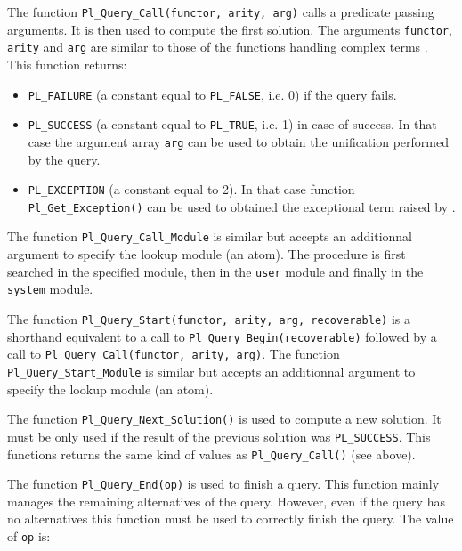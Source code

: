 The function \texttt{Pl\_Query\_Call(functor, arity, arg)} calls a predicate
passing arguments. It is then used to compute the first solution. The
arguments \texttt{functor}, \texttt{arity} and \texttt{arg} are similar to
those of the functions handling complex terms
. This function returns:

\begin{itemize}

\item \texttt{PL\_FAILURE} (a constant equal to \texttt{PL\_FALSE}, i.e. 0) if
the query fails.

\item \texttt{PL\_SUCCESS} (a constant equal to \texttt{PL\_TRUE}, i.e. 1) in
case of success. In that case the argument array \texttt{arg} can be used to
obtain the unification performed by the query.

\item \texttt{PL\_EXCEPTION} (a constant equal to 2). In that case function
\texttt{Pl\_Get\_Exception()} can be used to obtained the exceptional term
raised by  .

\end{itemize}

The function \texttt{Pl\_Query\_Call\_Module} is similar but accepts an
additionnal argument to specify the lookup module (an atom). The procedure is
first searched in the specified module, then in the \texttt{user} module and
finally in the \texttt{system} module.

The function \texttt{Pl\_Query\_Start(functor, arity, arg, recoverable)} is a
shorthand equivalent to a call to \texttt{Pl\_Query\_Begin(recoverable)} followed by
a call to \texttt{Pl\_Query\_Call(functor, arity, arg)}.  
The function \texttt{Pl\_Query\_Start\_Module} is similar but accepts an additionnal
argument to specify the lookup module (an atom).

The function \texttt{Pl\_Query\_Next\_Solution()} is used to compute a new
solution. It must be only used if the result of the previous solution was
\texttt{PL\_SUCCESS}. This functions returns the same kind of values as
\texttt{Pl\_Query\_Call()} (see above).

The function \texttt{Pl\_Query\_End(op)} is used to finish a query. This
function mainly manages the remaining alternatives of the query. However,
even if the query has no alternatives this function must be used to
correctly finish the query. The value of \texttt{op} is:

